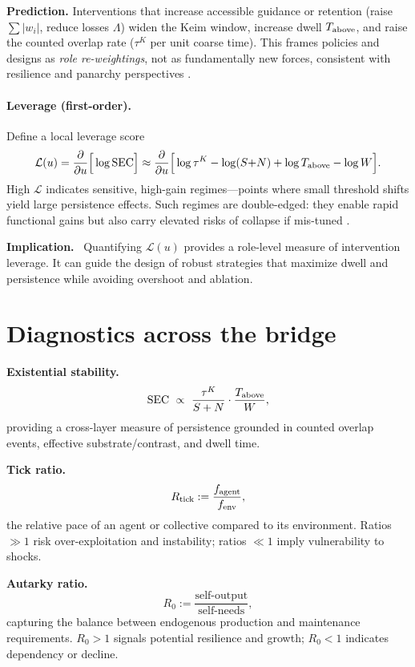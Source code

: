 \documentclass[12pt,a4paper,oneside]{scrreprt}
\newenvironment{implication}{\par\vspace{0.5em}\noindent\textbf{Implication.}\ }{\par\vspace{0.5em}}
\begin{document}
\textbf{Prediction.} 
Interventions that increase accessible guidance or retention (raise $\sum|w_i|$, reduce losses $\Lambda$) widen the Keim window, increase dwell $T_{\rm above}$, and raise the counted overlap rate ($\tau^K$ per unit coarse time). 
This frames policies and designs as \emph{role re-weightings}, not as fundamentally new forces, consistent with resilience and panarchy perspectives \cite{Holling1973,Walker2004}.

\paragraph{Leverage (first-order).}
Define a local leverage score
\[
\mathcal L(u)=\frac{\partial}{\partial u}\Big[\log \mathrm{SEC}\Big]
\approx 
\frac{\partial}{\partial u}\Big[
\log \tau^K - \log(S{+}N) + \log T_{\rm above} - \log W
\Big].
\]
High $\mathcal L$ indicates sensitive, high-gain regimes—points where small threshold shifts yield large persistence effects. 
Such regimes are double-edged: they enable rapid functional gains but also carry elevated risks of collapse if mis-tuned \cite{Scheffer2001,Rockstrom2009}. 

\begin{implication}
Quantifying $\mathcal L(u)$ provides a role-level measure of intervention leverage. 
It can guide the design of robust strategies that maximize dwell and persistence while avoiding overshoot and ablation.
\end{implication}

\section{Diagnostics across the bridge}\label{sec:bridge-diagnostics}
\textbf{Existential stability.}\ \ 
\[
\mathrm{SEC}\ \propto\ \frac{\tau^K}{S+N}\cdot\frac{T_{\rm above}}{W},
\]
providing a cross-layer measure of persistence grounded in counted overlap events, effective substrate/contrast, and dwell time.

\textbf{Tick ratio.}\ \
\[
R_{\rm tick}:=\frac{f_{\rm agent}}{f_{\rm env}},
\]
the relative pace of an agent or collective compared to its environment. Ratios $\gg 1$ risk over-exploitation and instability; ratios $\ll 1$ imply vulnerability to shocks.

\textbf{Autarky ratio.}\ \
\[
R_0:=\frac{\text{self-output}}{\text{self-needs}},
\]
capturing the balance between endogenous production and maintenance requirements. $R_0>1$ signals potential resilience and growth; $R_0<1$ indicates dependency or decline.
\end{document}
